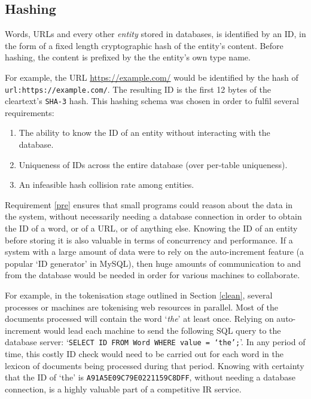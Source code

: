 \subsection{Hashing\label{hashing}}
Words, URLs and every other {\it entity} stored
in \nr{} databases, is identified by an ID, in the
form of a fixed length cryptographic hash of the entity's
content.  Before hashing, the content is prefixed by the the
entity's own type name.

For example, the URL \url{https://example.com/} would be
identified by the hash of {\tt url:https://example.com/}.
The resulting ID is the first 12 bytes of the cleartext's
{\tt SHA-3} hash.  This hashing schema was chosen in order
to fulfil several requirements:
\begin{enumerate}
    \item The ability to know the ID of an entity without
          interacting with the database.\label{pre}
    \item Uniqueness of IDs across the entire
          database (over per-table uniqueness).\label{uniq}
    \item An infeasible hash collision rate among entities.\label{low}
\end{enumerate}
Requirement \ref{pre} ensures that small programs 
could reason about the data in the \nr{} system,
without necessarily needing a database connection in order to
obtain the ID of a word, or of a URL, or of anything else.
Knowing the ID of an entity before storing it is also
valuable in terms of concurrency and performance.  If a system
with a large amount of data were to rely on the auto-increment
feature (a popular `ID generator' in MySQL), then
huge amounts of communication to and from the database
would be needed in order for various machines to collaborate.

For example, in the tokenisation stage outlined in Section
\ref{clean}, several processes or machines are tokenising web
resources in parallel.  Most of the documents processed will
contain the word `{\it the}' at least once.  Relying on
auto-increment would lead each machine to send the following
SQL query to the database server:
`{\tt SELECT ID FROM Word WHERE value = `the';}'.
In any period of time, this costly ID check would need to be
carried out for each word in the lexicon of documents being
processed during that period.  Knowing with certainty that
the ID of `the' is {\tt A91A5E09C79E0221159C8DFF}, without
needing a database connection, is a highly valuable part of a
competitive IR service.

